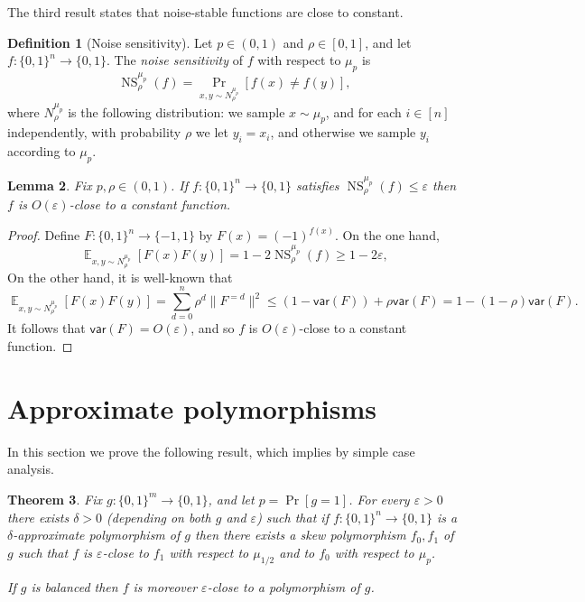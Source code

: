 \documentclass{article}
\newtheorem{theorem}{Theorem}[section]
\newtheorem{lemma}[theorem]{Lemma}
\theoremstyle{definition}
\newtheorem{definition}[theorem]{Definition}
\theoremstyle{remark}
\DeclareMathOperator*{\E}{\mathbb{E}}
\providecommand{\V}[1]{\mathsf{var}(#1)}
\DeclareMathOperator{\NS}{NS}
\newcommand\eps{\varepsilon}
\renewcommand\epsilon{\eps}
\renewcommand\geq{\geqslant}
\renewcommand\leq{\leqslant}
\begin{document}
The third result states that noise-stable functions are close to constant.

\begin{definition}[Noise sensitivity] \label{def:noise-sensitivity}
Let $p \in (0,1)$ and $\rho \in [0,1]$, and let $f\colon \{0,1\}^n \to \{0,1\}$. The \emph{noise sensitivity} of $f$ with respect to $\mu_p$ is
\[
 \NS_\rho^{\mu_p}(f) = \Pr_{x,y \sim N_\rho^{\mu_p}}[f(x) \neq f(y)],
\]
where $N_\rho^{\mu_p}$ is the following distribution: we sample $x \sim \mu_p$, and for each $i \in [n]$ independently, with probability $\rho$ we let $y_i = x_i$, and otherwise we sample $y_i$ according to $\mu_p$.
\end{definition}

\begin{lemma} \label{lem:noise-stable-constant}
Fix $p,\rho \in (0,1)$. If $f\colon \{0,1\}^n \to \{0,1\}$ satisfies $\NS_\rho^{\mu_p}(f) \leq \epsilon$ then $f$ is $O(\epsilon)$-close to a constant function.
\end{lemma}
\begin{proof}
Define $F\colon \{0,1\}^n \to \{-1,1\}$ by $F(x) = (-1)^{f(x)}$.
On the one hand,
\[
 \E_{x,y \sim N_\rho^{\mu_p}}[F(x) F(y)] = 1 - 2\NS_\rho^{\mu_p}(f) \geq 1 - 2\epsilon,
\]
On the other hand, it is well-known that
\[
 \E_{x,y \sim N_\rho^{\mu_p}}[F(x) F(y)] = \sum_{d=0}^n \rho^d \|F^{=d}\|^2 \leq (1 - \V{F}) + \rho \V{F} = 1 - (1-\rho) \V{F}.
\]
It follows that $\V{F} = O(\epsilon)$, and so $f$ is $O(\epsilon)$-close to a constant function.
\end{proof}

\section{Approximate polymorphisms}
\label{sec:approximate-polymorphisms}

In this section we prove the following result, which implies  by simple case analysis.

\begin{theorem} \label{thm:main}
Fix $g\colon \{0,1\}^m \to \{0,1\}$, and let $p = \Pr[g = 1]$. For every $\epsilon > 0$ there exists $\delta > 0$ (depending on both $g$ and $\epsilon$) such that if $f\colon \{0,1\}^n \to \{0,1\}$ is a $\delta$-approximate polymorphism of $g$ then there exists a skew polymorphism $f_0,f_1$ of $g$ such that $f$ is $\epsilon$-close to $f_1$ with respect to $\mu_{1/2}$ and to $f_0$ with respect to $\mu_p$.

If $g$ is balanced then $f$ is moreover $\epsilon$-close to a polymorphism of $g$.
\end{theorem}
\end{document}
